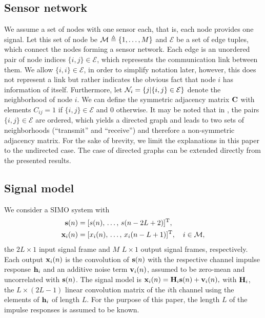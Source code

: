 \documentclass{article}
\begin{document}
\subsection[]{Sensor network}
We assume a set of nodes with one sensor each, that is, each node provides one signal.
Let this set of node be \(\mathcal{M} \triangleq \{1,\ldots,M\}\) and \(\mathcal{E}\) be a set of edge tuples, which connect the nodes forming a sensor network.
Each edge is an unordered pair of node indices \(\{i,j\} \in \mathcal{E}\), which represents the communication link between them.
We allow \(\{i,i\} \in \mathcal{E}\), in order to simplify notation later, however, this does not represent a link but rather indicates the obvious fact that node \(i\) has information of itself.
Furthermore, let \(\mathcal{N}_i = \{j|\{i,j\} \in \mathcal{E}\}\) denote the neighborhood of node \(i\).
We can define the symmetric adjacency matrix \(\bm{\mathrm{C}}\) with elements \(C_{ij} = 1\) if \(\{i,j\} \in \mathcal{E}\) and 0 otherwise.
It may be noted that in \cite{blochbergerDBSI}, the pairs \(\{i,j\} \in \mathcal{E}\) are ordered, which yields a directed graph and leads to two sets of neighborhoods (``transmit'' and ``receive'') and therefore a non-symmetric adjacency matrix.
For the sake of brevity, we limit the explanations in this paper to the undirected case.
The case of directed graphs can be extended directly from the presented results.

\subsection[]{Signal model}
We consider a SIMO system with
\begin{align}
    \bm{\mathrm{s}}(n) &= [s(n),\,\ldots,\,s(n-2L+2)]^{{\mathrm{T}}},\\
    \bm{\mathrm{x}}_i(n) &= [x_i(n),\,\ldots,\,x_i(n-L+1)]^{{\mathrm{T}}}, \quad i \in \mathcal{M},
\end{align}
the \(2L \times 1\) input signal frame and \(M\) \(L \times 1\)  output signal frames, respectively.
Each output \(\bm{\mathrm{x}}_i(n)\) is the convolution of \(\bm{\mathrm{s}}(n)\) with the respective channel impulse response \(\bm{\mathrm{h}}_i\) and an additive noise term \(\bm{\mathrm{v}}_i(n)\), assumed to be zero-mean and uncorrelated with \(\bm{\mathrm{s}}(n)\).
The signal model is \(\bm{\mathrm{x}}_i(n) = \bm{\mathrm{H}}_i \bm{\mathrm{s}}(n) + \bm{\mathrm{v}}_i(n),\)
with \(\bm{\mathrm{H}}_i\), the \(L \times (2L-1)\) linear convolution matrix of the \(i\)th channel using the elements of \(\bm{\mathrm{h}}_i\) of length \(L\).
For the purpose of this paper, the length \(L\) of the impulse responses is assumed to be known.
\end{document}
